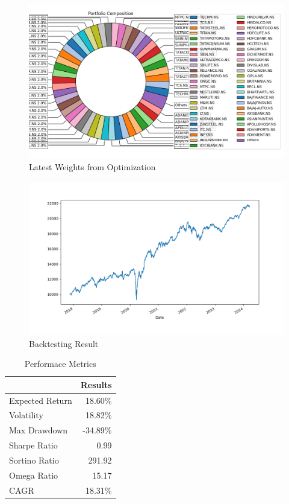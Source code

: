 \begin{figure}[H]
   \centering
   \includegraphics[width=1\linewidth]{images/LSTM/Weights.png}
   \caption{Latest Weights from Optimization}
   \label{fig:network_architecture1}
 \end{figure}

 \begin{figure}[H]
   \centering
   \includegraphics[width=1\linewidth]{images/LSTM/Backtest.png}
   \caption{Backtesting Result}
   \label{fig:network_architecture1}
 \end{figure}

 \begin{table}[H]

    \centering %
    \label{tab:performance_metrics}
    
    \caption{Performace Metrics}
    \vspace{5mm} %

\begin{tabular}{lr}
\toprule
 & Results \\
\midrule
Expected Return & 18.60\% \\
Volatility & 18.82\% \\
Max Drawdown & -34.89\% \\
Sharpe Ratio & 0.99 \\
Sortino Ratio & 291.92 \\
Omega Ratio & 15.17 \\
CAGR & 18.31\% \\
\bottomrule
\end{tabular}

\end{table}
